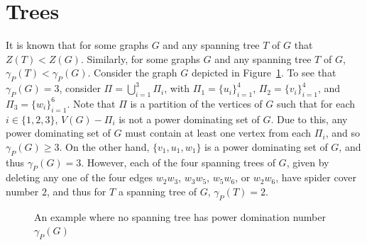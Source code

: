 \documentclass[11pt]{article}
\newcommand{\vertex}{\node[vertex]}
\begin{document}
\section{Trees}\label{sec:trees}
It is known that for some graphs $G$ and any spanning tree $T$ of $G$ that $Z(T) < Z(G)$. Similarly, for some graphs $G$ and any spanning tree $T$ of $G$, $\gamma_P(T)<\gamma_P(G)$. Consider the graph $G$ depicted in Figure~\ref{orderadj}. To see that $\gamma_P(G)=3$, consider $\Pi=\bigcup_{i=1}^3 \Pi_i$, with $\Pi_1=\{u_i\}_{i=1}^4$, $\Pi_2=\{v_i\}_{i=1}^4$, and $\Pi_3=\{w_i\}_{i=1}^6$. Note that $\Pi$ is a partition of the vertices of $G$ such that for each $i \in \{1,2,3\}$, $V(G)-\Pi_i$ is not a power dominating set of $G$.  Due to this, any power dominating set of $G$ must contain at least one vertex from each $\Pi_i$, and so $\gamma_P(G) \geq 3$.  On the other hand, $\{v_1,u_1,w_1\}$ is a power dominating set of $G$, and thus $\gamma_P(G)=3$.  However, each of the four spanning trees of $G$, given by deleting any one of the four edges $w_2w_3$, $w_3w_5$, $w_5w_6$, or $w_2w_6$, have spider cover number $2$, and thus for $T$ a spanning tree of $G$, $\gamma_P(T)=2$.



\begin{figure}[h]
\begin{center}
\end{center}
\caption{An example where no spanning tree has power domination number $\gamma_P(G)$}
\label{orderadj}
\end{figure}
\end{document}
